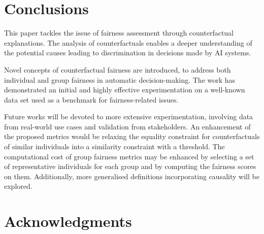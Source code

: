\documentclass[letterpaper]{article} %
\begin{document}
\section{Conclusions}
This paper tackles the issue of fairness assessment through counterfactual explanations. The analysis of counterfactuals enables a deeper understanding of the potential causes leading to discrimination in decisions made by AI systems.

Novel concepts of counterfactual fairness are introduced, to address both individual and group fairness in automatic decision-making.
%
%
The work has demonstrated an initial and highly effective experimentation on a well-known data set used as a benchmark for fairness-related issues.

Future works will be devoted to more extensive experimentation, involving data from real-world use cases and validation from stakeholders. 
%
An enhancement of the proposed metrics would be relaxing the equality constraint for counterfactuals of similar individuals into a similarity constraint with a threshold.
%
The computational cost of group fairness metrics may be enhanced by selecting a set of representative individuals for each group and by computing the fairness scores on them.
%
Additionally, more generalised definitions incorporating causality will be explored.


\section{Acknowledgments}

%

\end{document}
